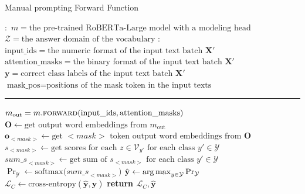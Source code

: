 \begin{algorithm}
\caption{Manual prompting Forward Function}\label{alg:manual-forward}
\begin{algorithmic}[1]
\small
\Require $\boldsymbol{:}$ \newline $m = \text{the pre-trained RoBERTa-Large model with a modeling head}$ \newline $\mathcal{Z} = \text{the answer domain of the vocabulary}$
\Ensure $\boldsymbol{:}$ \newline $\text{input\_ids} = \text{the numeric format of the input text batch }\mathbf{X}'$ \newline
    $\text{attention\_masks} = \text{the binary format of the input text batch }\mathbf{X}' $ \newline
    $\mathbf{y} = \text{correct class labels of the input text batch }\mathbf{X}'$ \newline
    $\text{mask\_pos} = \text{positions of the mask token in the input texts}$
\vspace{0.3em}
\hrule
\vspace{0.3em}
\State $m_\text{out} = m.\Call{\text{forward}}{\text{input\_ids}, \text{attention\_masks}}$
\State $\textbf{O} \gets \text{get output word embeddings from $m_\text{out}$}$  
 {\color{mylightgrey}}
 \State $\textbf{o}_{<\textit{mask}>} \gets \text{get $<\textit{mask}>$ token output word embeddings from $\textbf{O}$}$
\State $s_{<\textit{mask}>} \gets \text{get scores for each $z \in \mathcal{V}_{y'}$ for each class $y' \in \mathcal{Y}$}$ {\color{mylightgrey}}
\State ${sum\_s}_{<\textit{mask}>} \gets \text{get sum of $s_{<\textit{mask}>}$ for each class $y' \in \mathcal{Y}$}$ {\color{mylightgrey}}
\State $\Pr_{\mathcal{Y}} \gets \text{softmax(${sum\_s}_{<\textit{mask}>}$)}$
{\color{mylightgrey}}
\State $\hat{\mathbf{y}} \gets \operatorname*{arg\,max}_{y \in \mathcal{Y}} \Pr_{\mathcal{Y}}$
{\color{mylightgrey}}
\State $\mathcal{L}_C \gets \text{cross-entropy}(\hat{\mathbf{y}},\mathbf{y})$
{\color{mylightgrey}}
\State \textbf{return $\mathcal{L}_C, \hat{\mathbf{y}}$}
{\color{mylightgrey}}
\EndFunction
\end{algorithmic}
\end{algorithm}

